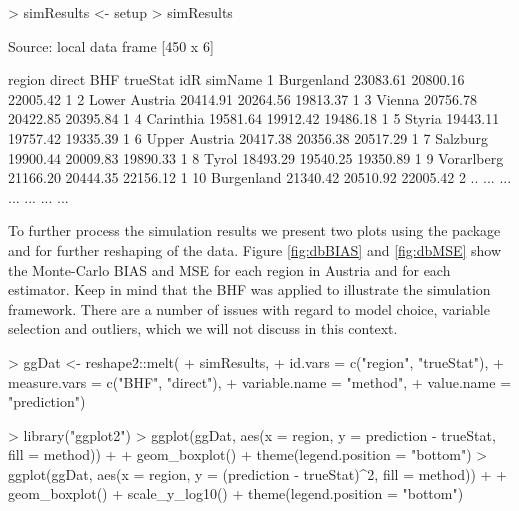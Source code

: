 \documentclass[article]{ajs}
\begin{document}
\begin{Schunk}
\begin{Sinput}
> simResults <- setup %
> simResults
\end{Sinput}
\begin{Soutput}
Source: local data frame [450 x 6]

          region   direct      BHF trueStat idR simName
1     Burgenland 23083.61 20800.16 22005.42   1        
2  Lower Austria 20414.91 20264.56 19813.37   1        
3         Vienna 20756.78 20422.85 20395.84   1        
4      Carinthia 19581.64 19912.42 19486.18   1        
5         Styria 19443.11 19757.42 19335.39   1        
6  Upper Austria 20417.38 20356.38 20517.29   1        
7       Salzburg 19900.44 20009.83 19890.33   1        
8          Tyrol 18493.29 19540.25 19350.89   1        
9     Vorarlberg 21166.20 20444.35 22156.12   1        
10    Burgenland 21340.42 20510.92 22005.42   2        
..           ...      ...      ...      ... ...     ...
\end{Soutput}
\end{Schunk}

To further process the simulation results we present two plots using the package  \citep{wickham09} and  \citep{wickham07} for further reshaping of the data. Figure \ref{fig:dbBIAS} and \ref{fig:dbMSE} show the Monte-Carlo BIAS and MSE for each region in Austria and for each estimator. Keep in mind that the BHF was applied to illustrate the simulation framework. There are a number of issues with regard to model choice, variable selection and outliers, which we will not discuss in this context.

\begin{Schunk}
\begin{Sinput}
> ggDat <- reshape2::melt(
+   simResults,
+   id.vars = c("region", "trueStat"), 
+   measure.vars = c("BHF", "direct"), 
+   variable.name = "method",
+   value.name = "prediction")
\end{Sinput}
\end{Schunk}

\begin{Schunk}
\begin{Sinput}
> library("ggplot2")
> ggplot(ggDat, aes(x = region, y = prediction - trueStat, fill = method)) + 
+   geom_boxplot() + theme(legend.position = "bottom")
> ggplot(ggDat, aes(x = region, y = (prediction - trueStat)^2, fill = method)) + 
+   geom_boxplot() + scale_y_log10() + theme(legend.position = "bottom")
\end{Sinput}
\end{Schunk}
\end{document}
